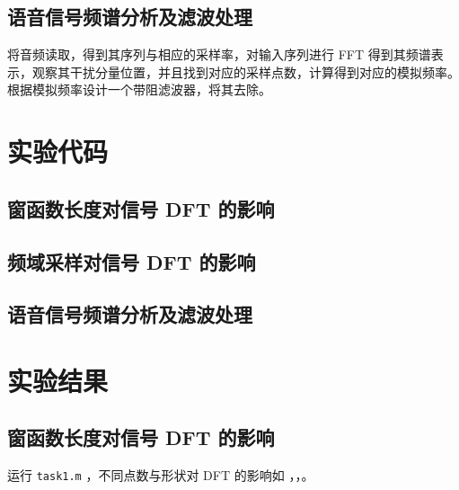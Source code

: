 \documentclass[lang=cn,11pt,a4paper,cite=authoryear]{elegantpaper}
\begin{document}
\subsection{语音信号频谱分析及滤波处理}

将音频读取，得到其序列与相应的采样率，对输入序列进行 FFT 得到其频谱表示，观察其干扰分量位置，并且找到对应的采样点数，计算得到对应的模拟频率。根据模拟频率设计一个带阻滤波器，将其去除。

\section{实验代码}


\subsection{窗函数长度对信号 DFT 的影响}




\subsection{频域采样对信号 DFT 的影响}





\subsection{语音信号频谱分析及滤波处理}



\section{实验结果}

\subsection{窗函数长度对信号 DFT 的影响}

运行 \lstinline{task1.m} ，不同点数与形状对 DFT 的影响如 ，，。


\end{document}
